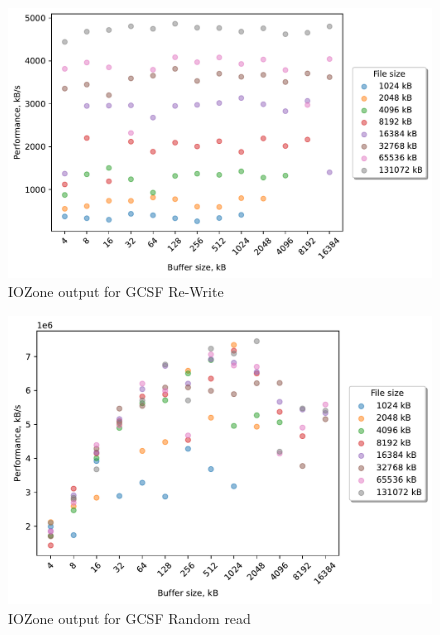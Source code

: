 \begin{figure}[!htb]
	\label{fig:bench_gcsf_re_write}
	\begin{center}
		\includegraphics[width=1.0\textwidth]{figures.nosync/benchmarking/gcsf/Re-Write.pdf}
	\end{center}
	\caption{IOZone output for GCSF \mbox{Re-Write}}
\end{figure}

\begin{figure}[!htb]
	\label{fig:bench_gcsf_rnd_read}
	\begin{center}
		\includegraphics[width=1.0\textwidth]{figures.nosync/benchmarking/gcsf/Random read.pdf}
	\end{center}
	\caption{IOZone output for GCSF Random read}
\end{figure}

